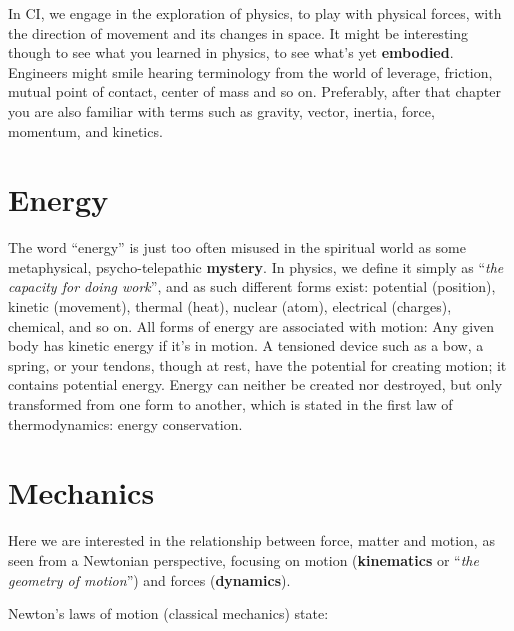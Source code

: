 In CI, we engage in the exploration of physics, to play with physical forces, with the direction of movement and its changes in space.
It might be interesting though to see what you learned in physics, to see what's yet \textbf{embodied}.
Engineers might smile hearing terminology from the world of leverage, friction, mutual point of contact, center of mass and so on.
Preferably, after that chapter you are also familiar with terms such as gravity, vector, inertia, force, momentum, and kinetics.

\section{Energy}\label{sec:energy}

The word ``energy'' is just too often misused in the spiritual world as some metaphysical, psycho-telepathic \textbf{mystery}.
In physics, we define it simply as ``\textit{the capacity for doing work}'', and as such different forms exist: potential (position), kinetic (movement), thermal (heat), nuclear (atom), electrical (charges), chemical, and so on.
All forms of energy are associated with motion: Any given body has kinetic energy if it's in motion.
A tensioned device such as a bow, a spring, or your tendons, though at rest, have the potential for creating motion; it contains potential energy.
Energy can neither be created nor destroyed, but only transformed from one form to another, which is stated in the first law of thermodynamics: energy conservation.

\section{Mechanics}\label{sec:mechanics}

Here we are interested in the relationship between force, matter and motion, as seen from a Newtonian perspective, focusing on motion (\textbf{kinematics} or ``\textit{the geometry of motion}'') and forces (\textbf{dynamics}).

Newton's laws of motion (classical mechanics) state:

